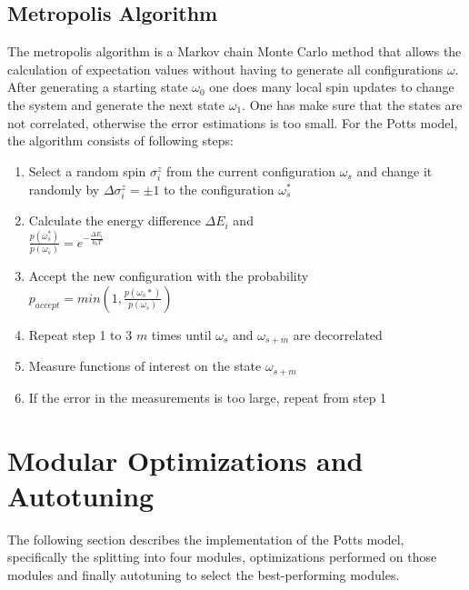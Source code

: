 \documentclass[letterpaper]{article}
\begin{document}
\subsection{Metropolis Algorithm}
The metropolis algorithm is a Markov chain Monte Carlo method \cite{MC} that
allows the calculation of expectation values without having to generate
all configurations $\omega$. After generating a starting state $\omega_{0}$
one does many local spin updates to change the system and generate
the next state $\omega_{1}$. One has make sure that the states are
not correlated, otherwise the error estimations is too small. For
the Potts model, the algorithm consists of following steps:
\begin{enumerate}[noitemsep, topsep = 0pt]
\item Select a random spin $\sigma_{i}^{z}$ from the current configuration
$\omega_{s}$ and change it randomly by $\Delta\sigma_{i}^{z}=\pm1$
to the configuration $\omega_{s}^{*}$
\item Calculate the energy difference $\Delta E_{i}$ and \\ $\frac{p(\omega_{s}^{*})}{p(\omega_{s})}=e^{-\frac{\Delta E_{i}}{k_{b}T}}$
\item Accept the new configuration with the probability
\\ $p_{accept}=min(1,\frac{p(\omega_{s}*)}{p(\omega_{s})})$
\item Repeat step 1 to 3 $m$ times until $\omega_{s}$ and $\omega_{s+m}$
are decorrelated
\item Measure functions of interest on the state $\omega_{s+m}$
\item If the error in the measurements is too large, repeat from step 1\end{enumerate}
\section{Modular Optimizations and Autotuning}\label{sec:yourmethod}
The following section describes the implementation of the Potts model, specifically the splitting into four modules, optimizations performed on those modules and finally autotuning to select the best-performing modules.
\end{document}
